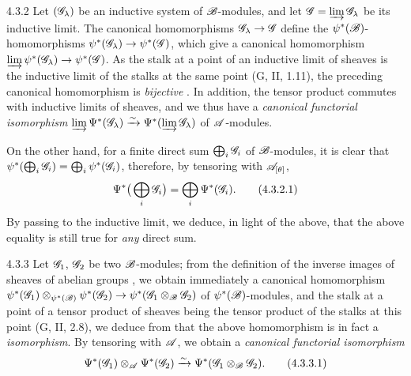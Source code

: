 \begin{env}{4.3.2}
\label{env-0.4.3.2}
Let $(\mathscr{G}_\lambda)$ be an inductive system of $\mathscr{B}$-modules, and let
$\mathscr{G}=\varinjlim\mathscr{G}_\lambda$ be its inductive limit. The canonical
homomorphisms $\mathscr{G}_\lambda\to\mathscr{G}$ define the
$\psi^*(\mathscr{B})$-homomorphisms $\psi^*(\mathscr{G}_\lambda)\to\psi^*(\mathscr{G})$, which
give a canonical homomorphism
$\varinjlim\psi^*(\mathscr{G}_\lambda)\to\psi^*(\mathscr{G})$. As the stalk at a point of
an inductive limit of sheaves is the inductive limit of the stalks at the same
point (G, II, 1.11), the preceding canonical homomorphism is \emph{bijective}
. In addition, the tensor product commutes with inductive
limits of sheaves, and we thus have a \emph{canonical functorial isomorphism}
$\varinjlim\Psi^*(\mathscr{G}_\lambda)\xrightarrow{\sim}\Psi^*(\varinjlim\mathscr{G}_\lambda)$ of
$\mathscr{A}$-modules.

On the other hand, for a finite direct sum $\bigoplus_i\mathscr{G}_i$ of
$\mathscr{B}$-modules, it is clear that
$\psi^*(\bigoplus_i\mathscr{G}_i)=\bigoplus_i\psi^*(\mathscr{G}_i)$, therefore, by
tensoring with $\mathscr{A}_{[\theta]}$,
\[
  \Psi^*\big(\bigoplus_i\mathscr{G}_i\big)=\bigoplus_i\Psi^*(\mathscr{G}_i).
  \tag{4.3.2.1}
\]
By passing to the inductive limit, we deduce, in light of the above, that the
above equality is still true for \emph{any} direct sum.
\end{env}

\begin{env}{4.3.3}
\label{env-0.4.3.3}
Let $\mathscr{G}_1$, $\mathscr{G}_2$ be two $\mathscr{B}$-modules; from the definition of the
inverse images of sheaves of abelian groups , we obtain
immediately a canonical homomorphism
$\psi^*(\mathscr{G}_1)\otimes_{\psi^*(\mathscr{B})}\psi^*(\mathscr{G}_2)
  \to\psi^*(\mathscr{G}_1\otimes_\mathscr{B}\mathscr{G}_2)$ of $\psi^*(\mathscr{B})$-modules, and
the stalk at a point of a tensor product of sheaves being the tensor product of
the stalks at this point (G, II, 2.8), we deduce from  that the
above homomorphism is in fact a \emph{isomorphism}. By tensoring with $\mathscr{A}$,
we obtain a \emph{canonical functorial isomorphism}
\[
  \Psi^*(\mathscr{G}_1)\otimes_\mathscr{A}\Psi^*(\mathscr{G}_2)
  \xrightarrow{\sim}\Psi^*(\mathscr{G}_1\otimes_\mathscr{B}\mathscr{G}_2).
  \tag{4.3.3.1}
\]
\end{env}

